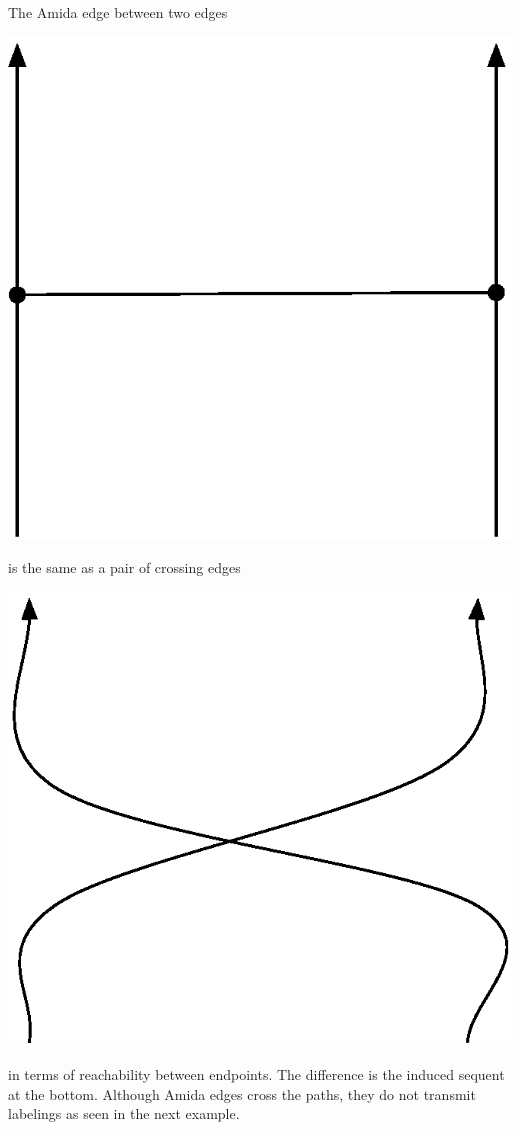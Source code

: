 The Amida edge between two edges
 \begin{center}
\includegraphics[scale=0.4]{twoedges_amida_without_label.eps}
 \end{center}
is the same as a pair of crossing edges
 \begin{center}
\includegraphics[scale=0.4]{crossing.eps}
 \end{center}
in terms of reachability between endpoints.
The difference is the induced sequent at the bottom.
Although Amida edges cross the paths,
they do not transmit labelings as seen in the next example.

